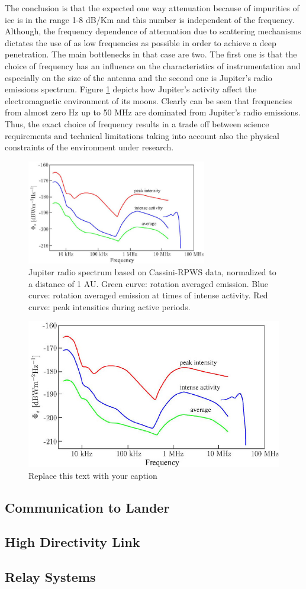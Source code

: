 The conclusion is that the expected one way attenuation because of impurities of ice is in the range 1-8 dB/Km and this number is independent of the frequency. Although, the frequency dependence of attenuation due to scattering mechanisms dictates the use of as low frequencies as possible in order to achieve a deep penetration. The main bottlenecks in that case are two. The first one is that the choice of frequency has an influence on the characteristics of instrumentation and especially on the size of the antenna and the second one is Jupiter's radio emissions spectrum. Figure \ref{J_spec} depicts how Jupiter's activity affect the electromagnetic environment of its moons. Clearly can be seen that frequencies from almost zero Hz up to 50 MHz are dominated from Jupiter's radio emissions. Thus, the exact choice of frequency results in a trade off between science requirements and technical limitations taking into account also the physical constraints of the environment under research. 

\begin{figure}[ht]
\centering
\label{J_spec}
\includegraphics[width=0.7\textwidth]{figures/below100.jpg}
\caption{Jupiter radio spectrum based on Cassini-RPWS data,
normalized to a distance of 1 AU. Green curve: rotation averaged
emission. Blue curve: rotation averaged emission at times of intense
activity. Red curve: peak intensities during active periods. \cite{Grie_meier_2005}}
\end{figure}


\begin{figure}[ht]
\begin{center}
\includegraphics[width=0.7\columnwidth]{figures/below100}
\caption{Replace this text with your caption%
}
\end{center}
\end{figure}

\subsection{Communication to Lander}

\subsection{High Directivity Link}

\subsection{Relay Systems}
